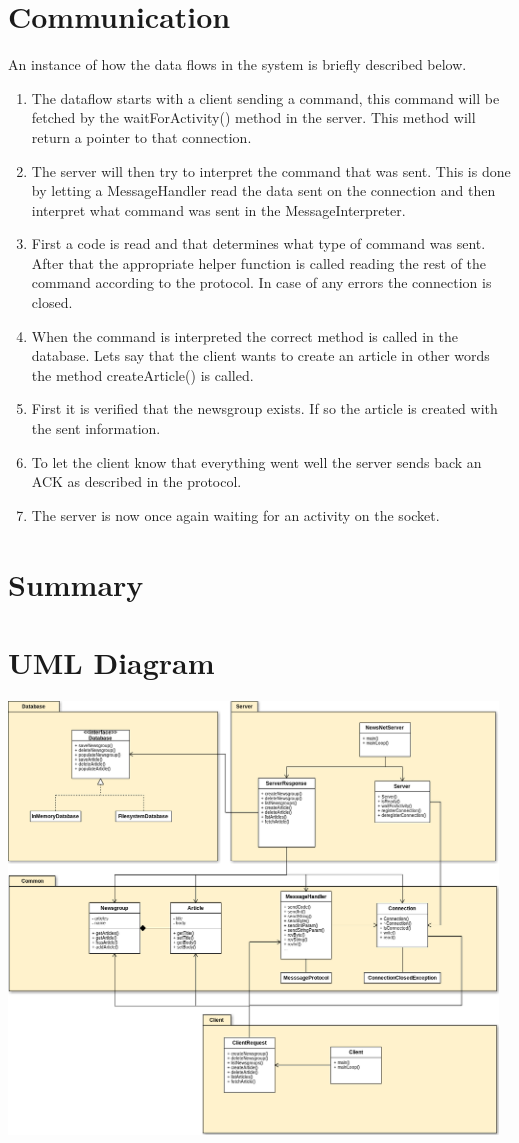 \documentclass[a4paper, titlepage]{article}
\begin{document}
\section{Communication}\label{communication}
An instance of how the data flows in the system is briefly described below.

\begin{enumerate}
    \item The dataflow starts with a client sending a command, this command will be fetched by the waitForActivity() method in the server. This method will return a pointer to that connection.
	\item The server will then try to interpret the command that was sent. This is done by letting a MessageHandler read the data sent on the connection and then interpret what command was sent in the MessageInterpreter.
	\item First a code is read and that determines what type of command was sent. After that the appropriate helper function is called reading the rest of the command according to the protocol. In case of any errors the connection is closed.
	\item When the command is interpreted the correct method is called in the database. Lets say that the client wants to create an article in other words the method createArticle() is called.
	\item First it is verified that the newsgroup exists. If so the article is created with the sent information.
	\item To let the client know that everything went well the server sends back an ACK as described in the protocol.
	\item The server is now once again waiting for an activity on the socket.
\end{enumerate}

\section{Summary}\label{summary}

\newpage
\appendix
\section{UML Diagram}\label{App:AppendixA}
\includegraphics[width=130mm]{NewsNet_UML.png}
\end{document}
